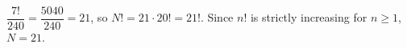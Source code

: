 $\dfrac{7!}{240}=\dfrac{5040}{240}=21$, so $N!=21\cdot20!=21!$. Since $n!$ is strictly increasing for $n\ge1$, $N=\boxed{21}$.
